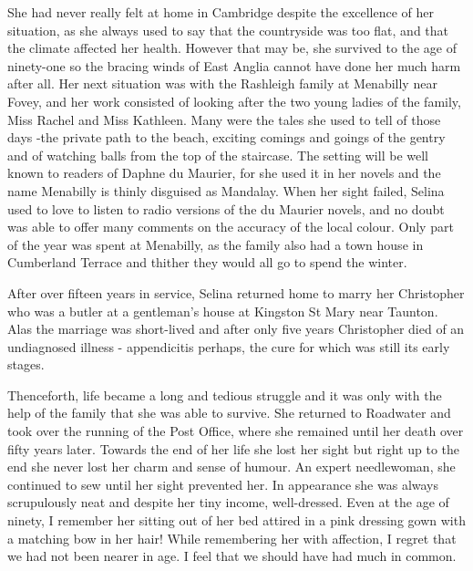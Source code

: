 She had never really felt at home in Cambridge despite the excellence of her situation, as she always used to say that the countryside was too flat, and that the climate affected her health. However that may be, she survived to the age of ninety-one so the bracing winds of East Anglia cannot have done her much harm after all. Her next situation was with the Rashleigh family at Menabilly near Fovey, and her work consisted of looking after the two young ladies of the family, Miss Rachel and Miss Kathleen. Many were the tales she used to tell of those days -the private path to the beach, exciting comings and goings of the gentry and of watching balls from the top of the staircase. The setting will be well known to readers of Daphne du Maurier, for she used it in her novels and the name Menabilly is thinly disguised as Mandalay. When her sight failed, Selina used to love to listen to radio versions of the du Maurier novels, and no doubt was able to offer many comments on the accuracy of the local colour. Only part of the year was spent at Menabilly, as the family also had a town house in Cumberland Terrace and thither they would all go to spend the winter.

After over fifteen years in service, Selina returned home to marry her Christopher who was a butler at a gentleman's house at Kingston St Mary near Taunton. Alas the marriage was short-lived and after only five years Christopher died of an undiagnosed illness - appendicitis perhaps, the cure for which was still its early stages.

Thenceforth, life became a long and tedious struggle and it was only with the help of the family that she was able to survive. She returned to Roadwater and took over the running of the Post Office, where she remained until her death over fifty years later. Towards the end of her life she lost her sight but right up to the end she never lost her charm and sense of humour. An expert needlewoman, she continued to sew until her sight prevented her. In appearance she was always scrupulously neat and despite her tiny income, well-dressed. Even at the age of ninety, I remember her sitting out of her bed attired in a pink dressing gown with a matching bow in her hair! While remembering her with affection, I regret that we had not been nearer in age. I feel that we should have had much in common.

